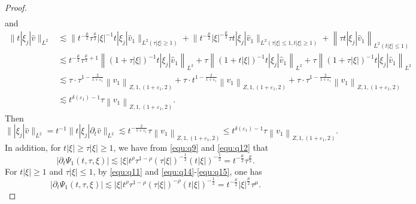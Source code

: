 \documentclass[11pt,twoside]{article}
\newcommand{\p}{\partial}
\theoremstyle{plain}
\theoremstyle{definition}
\theoremstyle{remark}
\numberwithin{equation}{section}
\begin{document}
\begin{proof}
\begin{equation}
\begin{aligned}
\end{aligned}
\end{equation}
and
\begin{equation}\label{equ:l9-1}
\begin{aligned}
\|t|\xi_j|\hat{v}\|_{L^2} & \lesssim\big\|t^{-\frac{\mu}{2}} \tau^{\frac{\mu}{2}}|\xi|^{-1}t|\xi_j| \hat{v}_1\big\|_{L^2(\tau|\xi| \geqslant 1)}+\big\|t^{-\frac{\mu}{2}}|\xi|^{-\frac{\mu}{2}} \tau t|\xi_j| \hat{v}_1\big\|_{L^2(\tau|\xi| \leqslant 1, t|\xi| \geqslant 1)}+\left\|\tau t|\xi_j|\hat{v}_1\right\|_{L^2(t|\xi| \leqslant 1)} \\
& \lesssim t^{-\frac{\mu}{2}} \tau^{\frac{\mu}{2}+1} \left\|(1+\tau|\xi|)^{-1} t|\xi_j|\hat{v}_1\right\|_{L^2}+\tau\left\|(1+t|\xi|)^{-1} t|\xi_j|\hat{v}_1\right\|_{L^2}+\tau\left\|(1+\tau|\xi|)^{-1} t|\xi_j|\hat{v}_1\right\|_{L^2} \\
& \lesssim  \tau \cdot \tau^{1-\frac{2}{1+\varepsilon_1}}\left\|v_1\right\|_{Z, 1, \left(1+\varepsilon_1, 2\right)}+\tau \cdot t^{1-\frac{2}{1+\varepsilon_1}}\left\|v_1\right\|_{Z, 1, \left(1+\varepsilon_1, 2\right)}+\tau \cdot \tau^{1-\frac{2}{1+\varepsilon_1}}\left\|v_1\right\|_{Z, 1, \left(1+\varepsilon_1, 2\right)} \\
& \lesssim  t^{\delta(\varepsilon_1)-1} \tau\left\|v_1\right\|_{Z, 1, \left(1+\varepsilon_1, 2\right)}.
\end{aligned}
\end{equation}
Then
\begin{equation}\label{equ:l9-2}
\||\xi_j|\hat{v}\|_{L^2}=t^{-1}\|t|\xi_j|\p_t\hat{v}\|_{L^2}
 \lesssim t^{-\frac{2}{1+\varepsilon_1}} \tau\left\|v_1\right\|_{Z, 1, \left(1+\varepsilon_1, 2\right)}\leq t^{\delta(\varepsilon_1)-1} \tau\left\|v_1\right\|_{Z, 1, \left(1+\varepsilon_1, 2\right)}.
\end{equation}
In addition, for $t|\xi|\geq\tau|\xi|\geq 1$,  we have from \eqref{equ:q9} and \eqref{equ:q12} that
\begin{equation}\label{equ:l10}
 \left|\p_t\Psi_1(t, \tau, \xi)\right|  \lesssim |\xi| t^\rho\tau^{1-\rho}(\tau|\xi|)^{-\frac{1}{2}}(t|\xi|)^{-\frac{1}{2}}=t^{-\frac{\mu}{2}}\tau^{\frac{\mu}{2}}.
\end{equation}
For $t|\xi|\geq 1$ and $ \tau|\xi|\leq 1$, by \eqref{equ:q11} and \eqref{equ:q14}-\eqref{equ:q15}, one has
\begin{equation}\label{equ:l11}
\left|\p_t\Psi_1(t, \tau, \xi)\right|  \lesssim |\xi| t^\rho\tau^{1-\rho}(\tau|\xi|)^{-\rho}(t|\xi|)^{-\frac{1}{2}}=t^{-\frac{\mu}{2}}|\xi|^{\frac{\mu}{2}}\tau^{\mu}.

\end{equation}
\end{proof}
\end{document}
